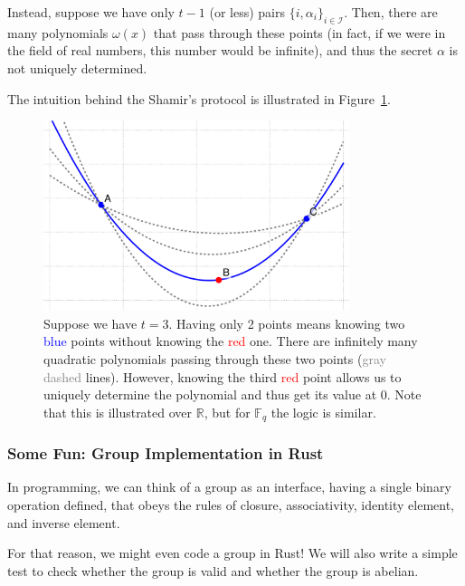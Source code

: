 \documentclass[../lecture-notes.tex]{subfiles}
\begin{document}
Instead, suppose we have only $t-1$ (or less) pairs $\{i,\alpha_i\}_{i \in \mathcal{I}}$. Then, there are many polynomials $\omega(x)$ that pass through these points (in fact, if we were in the field of real numbers, this number would be infinite), and thus the secret $\alpha$ is not uniquely determined.

The intuition behind the Shamir's protocol is illustrated in Figure~\ref{fig:shamir}.

\begin{figure}
    \centering
    \includegraphics[width=0.8\textwidth]{images/lecture_1/shamir_demo.pdf}
    \caption{Suppose we have $t=3$. Having only 2 points means knowing two \textcolor{blue}{blue} points without knowing the \textcolor{red}{red} one. There are infinitely many quadratic polynomials passing through these two points (\textcolor{gray}{gray dashed} lines). However, knowing the third \textcolor{red}{red} point allows us to uniquely determine the polynomial and thus get its value at $0$. Note that this is illustrated over $\mathbb{R}$, but for $\mathbb{F}_q$ the logic is similar.}
    \label{fig:shamir}
\end{figure}

\pagebreak

\subsubsection{Some Fun: Group Implementation in Rust}

In programming, we can think of a group as an interface, having a single binary operation defined, that obeys the rules of closure, associativity, identity element, and inverse element.

For that reason, we might even code a group in Rust! We will also write a simple test to check whether the group is valid and whether the group is abelian.
\end{document}
